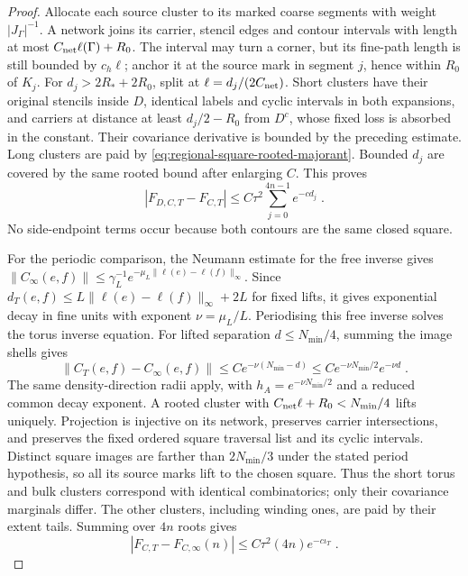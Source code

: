 \documentclass[11pt]{article}
\begin{document}
\begin{proof}
Allocate each source cluster to its marked coarse segments with weight $|J_\Gamma|^{-1}$. A network joins its carrier, stencil edges and contour intervals with length at most $C_{\rm net}\ell(\Gamma)+R_0$. The interval may turn a corner, but its fine-path length is still bounded by $c_h\ell$; anchor it at the source mark in segment $j$, hence within $R_0$ of $K_j$. For $d_j>2R_*+2R_0$, split at $\ell=d_j/(2C_{\rm net})$. Short clusters have their original stencils inside $D$, identical labels and cyclic intervals in both expansions, and carriers at distance at least $d_j/2-R_0$ from $D^c$, whose fixed loss is absorbed in the constant. Their covariance derivative is bounded by the preceding estimate. Long clusters are paid by \eqref{eq:regional-square-rooted-majorant}. Bounded $d_j$ are covered by the same rooted bound after enlarging $C$. This proves
\begin{equation}\label{eq:regional-square-boundary-comparison}
    |F_{D,C,T}-F_{C,T}|\leq C\tau^2\sum_{j=0}^{4n-1}e^{-cd_j}\;.
\end{equation}
No side-endpoint terms occur because both contours are the same closed square.

For the periodic comparison, the Neumann estimate for the free inverse gives $\|C_\infty(e,f)\|\leq\gamma_L^{-1}e^{-\mu_L\|\ell(e)-\ell(f)\|_\infty}$. Since $d_T(e,f)\leq L\|\ell(e)-\ell(f)\|_\infty+2L$ for fixed lifts, it gives exponential decay in fine units with exponent $\nu=\mu_L/L$. Periodising this free inverse solves the torus inverse equation. For lifted separation $d\leq N_{\min}/4$, summing the image shells gives
\begin{equation}
    \|C_T(e,f)-C_\infty(e,f)\|
        \leq Ce^{-\nu(N_{\min}-d)}
        \leq Ce^{-\nu N_{\min}/2}e^{-\nu d}\;.
\end{equation}
The same density-direction radii apply, with $h_A=e^{-\nu N_{\min}/2}$ and a reduced common decay exponent. A rooted cluster with $C_{\rm net}\ell+R_0<N_{\min}/4$ lifts uniquely. Projection is injective on its network, preserves carrier intersections, and preserves the fixed ordered square traversal list and its cyclic intervals. Distinct square images are farther than $2N_{\min}/3$ under the stated period hypothesis, so all its source marks lift to the chosen square. Thus the short torus and bulk clusters correspond with identical combinatorics; only their covariance marginals differ. The other clusters, including winding ones, are paid by their extent tails. Summing over $4n$ roots gives
\begin{equation}\label{eq:regional-square-periodic-comparison}
    |F_{C,T}-F_{C,\infty}(n)|\leq C\tau^2(4n)e^{-c\iota_T}\;.
\end{equation}


\end{proof}
\end{document}
